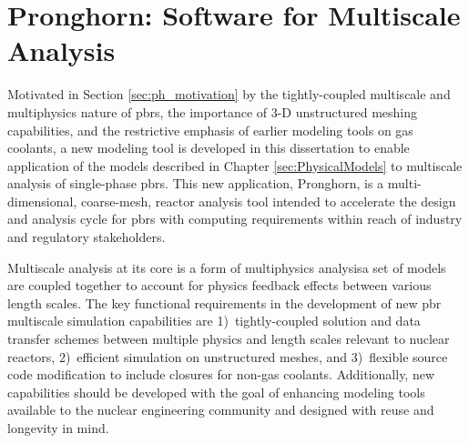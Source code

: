 \chapter{Pronghorn: Software for Multiscale Analysis}
\label{sec:ph}


Motivated in Section \ref{sec:ph_motivation} by the tightly-coupled multiscale and multiphysics nature of \glspl{pbr}, the importance of 3-D unstructured meshing capabilities, and the restrictive emphasis of earlier modeling tools on gas coolants, a new modeling tool is developed in this dissertation to enable application of the models described in Chapter \ref{sec:PhysicalModels} to multiscale analysis of single-phase \glspl{pbr}. This new application, Pronghorn, is a multi-dimensional, coarse-mesh, reactor analysis tool intended to accelerate the design and analysis cycle for \glspl{pbr} with computing requirements within reach of industry and regulatory stakeholders. 

Multiscale analysis at its core is a form of multiphysics analysis\mdash a set of models are coupled together to account for physics feedback effects between various length scales. The key functional requirements in the development of new \gls{pbr} multiscale simulation capabilities are 1)~tightly-coupled solution and data transfer schemes between multiple physics and length scales relevant to nuclear reactors, 2)~efficient simulation on unstructured meshes, and 3)~flexible source code modification to include closures for non-gas coolants. Additionally, new capabilities should be developed with the goal of enhancing modeling tools available to the nuclear engineering community and designed with reuse and longevity in mind.

